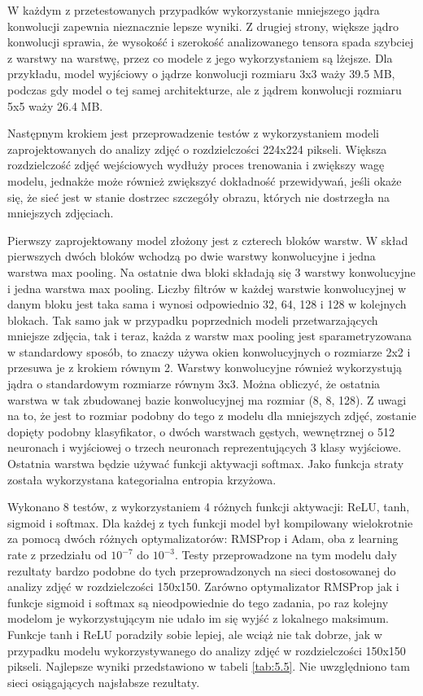 W każdym z przetestowanych przypadków wykorzystanie mniejszego jądra konwolucji zapewnia nieznacznie lepsze wyniki. Z drugiej strony, większe jądro konwolucji sprawia, że wysokość i szerokość analizowanego tensora spada szybciej z warstwy na warstwę, przez co modele z jego wykorzystaniem są lżejsze. Dla przykładu, model wyjściowy o jądrze konwolucji rozmiaru 3x3 waży 39.5 MB, podczas gdy model o tej samej architekturze, ale z jądrem konwolucji rozmiaru 5x5 waży 26.4 MB.

Następnym krokiem jest przeprowadzenie testów z wykorzystaniem modeli zaprojektowanych do analizy zdjęć o rozdzielczości 224x224 pikseli. Większa rozdzielczość zdjęć wejściowych wydłuży proces trenowania i zwiększy wagę modelu, jednakże może również zwiększyć dokładność przewidywań, jeśli okaże się, że sieć jest w stanie dostrzec szczegóły obrazu, których nie dostrzegła na mniejszych zdjęciach.

Pierwszy zaprojektowany model złożony jest z czterech bloków warstw. W skład pierwszych dwóch bloków wchodzą po dwie warstwy konwolucyjne i jedna warstwa max pooling. Na ostatnie dwa bloki składają się 3 warstwy konwolucyjne i jedna warstwa max pooling. Liczby filtrów w każdej warstwie konwolucyjnej w danym bloku jest taka sama i wynosi odpowiednio 32, 64, 128 i 128 w kolejnych blokach. Tak samo jak w przypadku poprzednich modeli przetwarzających mniejsze zdjęcia, tak i teraz, każda z warstw max pooling jest sparametryzowana w standardowy sposób, to znaczy używa okien konwolucyjnych o rozmiarze 2x2 i przesuwa je z krokiem równym 2. Warstwy konwolucyjne również wykorzystują jądra o standardowym rozmiarze równym 3x3. Można obliczyć, że ostatnia warstwa w tak zbudowanej bazie konwolucyjnej ma rozmiar (8, 8, 128). Z uwagi na to, że jest to rozmiar podobny do tego z modelu dla mniejszych zdjęć, zostanie dopięty podobny klasyfikator, o dwóch warstwach gęstych, wewnętrznej o 512 neuronach i wyjściowej o trzech neuronach reprezentujących 3 klasy wyjściowe. Ostatnia warstwa będzie używać funkcji aktywacji softmax. Jako funkcja straty została wykorzystana kategorialna entropia krzyżowa.

Wykonano 8 testów, z wykorzystaniem 4 różnych funkcji aktywacji: ReLU, tanh, sigmoid i softmax. Dla każdej z tych funkcji model był kompilowany wielokrotnie za pomocą dwóch różnych optymalizatorów: RMSProp i Adam, oba z learning rate z przedziału od $10^{-7}$ do $10^{-3}$. Testy przeprowadzone na tym modelu dały rezultaty bardzo podobne do tych przeprowadzonych na sieci dostosowanej do analizy zdjęć w rozdzielczości 150x150. Zarówno optymalizator RMSProp jak i funkcje sigmoid i softmax są nieodpowiednie do tego zadania, po raz kolejny modelom je wykorzystującym nie udało im się wyjść z lokalnego maksimum. Funkcje tanh i ReLU poradziły sobie lepiej, ale wciąż nie tak dobrze, jak w przypadku modelu wykorzystywanego do analizy zdjęć w rozdzielczości 150x150 pikseli. Najlepsze wyniki przedstawiono w tabeli \ref{tab:5.5}. Nie uwzględniono tam sieci osiągających najsłabsze rezultaty.

